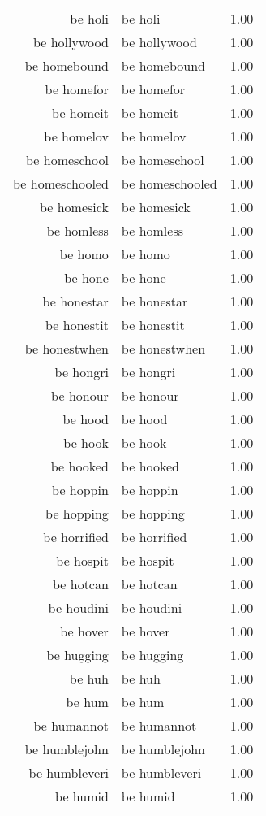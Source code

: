 \begin{table}[ht]
\begin{tabular}{rlr}
  be holi & be holi & 1.00 \\ 
  be hollywood & be hollywood & 1.00 \\ 
  be homebound & be homebound & 1.00 \\ 
  be homefor & be homefor & 1.00 \\ 
  be homeit & be homeit & 1.00 \\ 
  be homelov & be homelov & 1.00 \\ 
  be homeschool & be homeschool & 1.00 \\ 
  be homeschooled & be homeschooled & 1.00 \\ 
  be homesick & be homesick & 1.00 \\ 
  be homless & be homless & 1.00 \\ 
  be homo & be homo & 1.00 \\ 
  be hone & be hone & 1.00 \\ 
  be honestar & be honestar & 1.00 \\ 
  be honestit & be honestit & 1.00 \\ 
  be honestwhen & be honestwhen & 1.00 \\ 
  be hongri & be hongri & 1.00 \\ 
  be honour & be honour & 1.00 \\ 
  be hood & be hood & 1.00 \\ 
  be hook & be hook & 1.00 \\ 
  be hooked & be hooked & 1.00 \\ 
  be hoppin & be hoppin & 1.00 \\ 
  be hopping & be hopping & 1.00 \\ 
  be horrified & be horrified & 1.00 \\ 
  be hospit & be hospit & 1.00 \\ 
  be hotcan & be hotcan & 1.00 \\ 
  be houdini & be houdini & 1.00 \\ 
  be hover & be hover & 1.00 \\ 
  be hugging & be hugging & 1.00 \\ 
  be huh & be huh & 1.00 \\ 
  be hum & be hum & 1.00 \\ 
  be humannot & be humannot & 1.00 \\ 
  be humblejohn & be humblejohn & 1.00 \\ 
  be humbleveri & be humbleveri & 1.00 \\ 
  be humid & be humid & 1.00 \\ 

\end{tabular}
\end{table}

